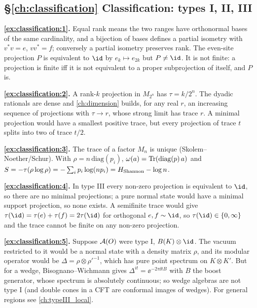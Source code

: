 {\subsection*{\S\ref{ch:classification} Classification: types I, II, III}
\textbf{\ref{ex:classification:1}.} Equal rank means the two ranges have orthonormal bases of the same cardinality, and a bijection of bases defines a partial isometry with $v^*v=e$, $vv^*=f$; conversely a partial isometry preserves rank. The even-site projection $P$ is equivalent to $\id$ by $e_k\mapsto e_{2k}$ but $P\ne\id$. It is not finite: a projection is finite iff it is not equivalent to a proper subprojection of itself, and $P$ is.\par
\textbf{\ref{ex:classification:2}.} A rank-$k$ projection in $M_{2^n}$ has $\tau=k/2^n$. The dyadic rationals are dense and \cref{ch:dimension} builds, for any real $r$, an increasing sequence of projections with $\tau\to r$, whose strong limit has trace $r$. A minimal projection would have a smallest positive trace, but every projection of trace $t$ splits into two of trace $t/2$.\par
\textbf{\ref{ex:classification:3}.} The trace of a factor $M_n$ is unique (Skolem--Noether/Schur). With $\rho=n\,\mathrm{diag}(p_i)$, $\omega(a)=\operatorname{Tr}(\mathrm{diag}(p)\,a)$ and $S=-\tau(\rho\log\rho)=-\sum_ip_i\log(np_i)=H_{\rm Shannon}-\log n$.\par
\textbf{\ref{ex:classification:4}.} In type III every non-zero projection is equivalent to $\id$, so there are no minimal projections; a pure normal state would have a minimal support projection, so none exists. A semifinite trace would give $\tau(\id)=\tau(e)+\tau(f)=2\tau(\id)$ for orthogonal $e,f\sim\id$, so $\tau(\id)\in\{0,\infty\}$ and the trace cannot be finite on any non-zero projection.\par
\textbf{\ref{ex:classification:5}.} Suppose $\mathcal{A}(O)$ were type I, $B(K)\otimes\id$. The vacuum restricted to it would be a normal state with a density matrix $\rho$, and its modular operator would be $\Delta=\rho\otimes\rho'^{-1}$, which has pure point spectrum on $K\otimes K'$. But for a wedge, Bisognano--Wichmann gives $\Delta^{it}=\ee^{-2\pi\ii tB}$ with $B$ the boost generator, whose spectrum is absolutely continuous; so wedge algebras are not type I (and double cones in a CFT are conformal images of wedges). For general regions see \cref{ch:typeIII_local}.\par

}
